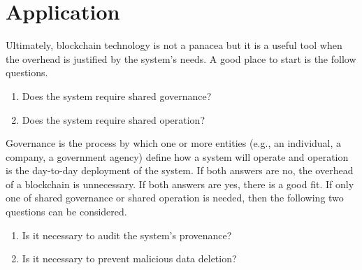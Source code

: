 
\section{Application}

Ultimately, blockchain technology is not a panacea but it is a useful tool when the overhead is justified by the system's needs. A good place to start is the follow questions. 



\begin{enumerate}
	\item Does the system require shared governance?
	\item Does the system require shared operation?
\end{enumerate}

Governance is the process by which one or more entities (e.g., an individual, a company, a government agency) define how a system will operate and operation is the day-to-day deployment of the system. If both answers are no, the overhead of a blockchain is unnecessary. If both answers are yes, there is a good fit. If only one of shared governance or shared operation is needed, then the following two questions can be considered.

\begin{enumerate}[start=3]
	\item Is it necessary to audit the system's provenance?
	\item Is it necessary to prevent malicious data deletion?
\end{enumerate}

